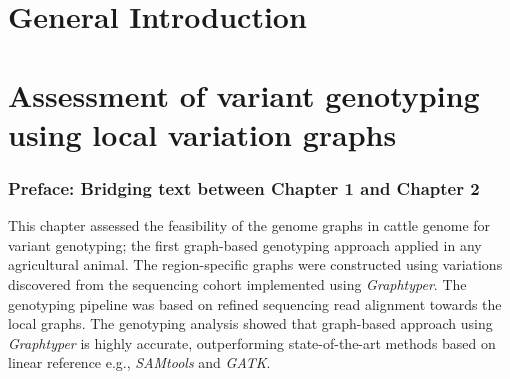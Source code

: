\documentclass[11 pt, a4paper, notitlepage, twoside]{report}
\begin{document}
\chapter[General Introduction]{\LARGE{General Introduction}}
\label{chap:intro}

\bigskip



\iftwoside
\cleardoublepage
\newpage
\fi


\chapter[Feasibility of the bovine genome graphs]{\LARGE{Assessment of variant genotyping using local variation graphs}}
\label{chap:locgraph}
\subsection*{Preface: Bridging text between Chapter 1 and Chapter 2}
\onehalfspacing
\normalsize
This chapter assessed the feasibility of the genome graphs in cattle genome for variant genotyping; the first graph-based genotyping approach applied in any agricultural animal. The region-specific graphs were constructed using variations discovered from the sequencing cohort implemented using \emph{Graphtyper}. The genotyping pipeline was based on refined sequencing read alignment towards the local graphs. The genotyping analysis showed that graph-based approach using \textit{Graphtyper} is highly accurate, outperforming state-of-the-art methods based on linear reference e.g., \textit{SAMtools} and \emph{GATK}. \\

\bigskip

\end{document}
